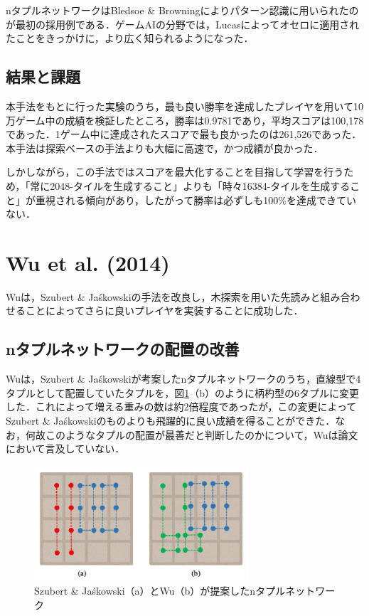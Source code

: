 \documentclass{suribt}
\begin{document}
nタプルネットワークはBledsoe \& Browningによりパターン認識に用いられたのが最初の採用例である\cite{Bledsoe}．ゲームAIの分野では，Lucasによってオセロに適用されたことをきっかけに，より広く知られるようになった\cite{Lucas}．

\subsection{結果と課題}
本手法をもとに行った実験のうち，最も良い勝率を達成したプレイヤを用いて10万ゲーム中の成績を検証したところ，勝率は0.9781であり，平均スコアは100,178であった．1ゲーム中に達成されたスコアで最も良かったのは261,526であった．本手法は探索ベースの手法よりも大幅に高速で，かつ成績が良かった\cite{Szubert}．

しかしながら，この手法ではスコアを最大化することを目指して学習を行うため，「常に2048-タイルを生成すること」よりも「時々16384-タイルを生成すること」が重視される傾向があり，したがって勝率は必ずしも100\%を達成できていない．

\section{Wu et al. (2014)}
Wuは，Szubert \& Ja\'{s}kowskiの手法を改良し，木探索を用いた先読みと組み合わせることによってさらに良いプレイヤを実装することに成功した．

\subsection{nタプルネットワークの配置の改善}
Wuは，Szubert \& Ja\'{s}kowskiが考案したnタプルネットワークのうち，直線型で4タプルとして配置していたタプルを，図\ref{figure_002}（b）のように柄杓型の6タプルに変更した．これによって増える重みの数は約2倍程度であったが，この変更によってSzubert \& Ja\'{s}kowskiのものよりも飛躍的に良い成績を得ることができた．なお，何故このようなタプルの配置が最善だと判断したのかについて，Wuは論文において言及していない．

\begin{figure}[t]
	\begin{center}
	\includegraphics[width=8cm]{figure_002.png}
	\caption{Szubert \& Ja\'{s}kowski（a）とWu（b）が提案したnタプルネットワーク}
	\label{figure_002}
	\end{center}
\end{figure}
\end{document}
